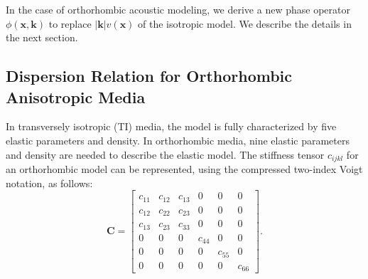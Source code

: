 In the case of orthorhombic acoustic modeling, 
we derive a new phase operator $\phi(\mathbf{x},\mathbf{k})$
to replace $|\mathbf{k}|v(\mathbf{x})$ of the isotropic model.
We describe the details in the next section.


\subsection{Dispersion Relation for Orthorhombic Anisotropic Media}

In transversely isotropic (TI) media, 
the model is fully characterized by five elastic parameters and density.
In orthorhombic media, nine elastic parameters and density are needed to describe the elastic model.
The stiffness tensor $c_{ijkl}$ for an orthorhombic model can be represented, 
using the compressed two-index Voigt notation, as follows:
\begin{equation}
  \label{eq:stiffness}
  \mathbf{C}= \left[\begin{array}{llllll}
           c_{11} & c_{12} & c_{13} & 0 & 0 & 0 \\
           c_{12} & c_{22} & c_{23} & 0 & 0 & 0 \\
           c_{13} & c_{23} & c_{33} & 0 & 0 & 0 \\
           0      & 0      & 0      & c_{44} & 0 & 0  \\
           0      & 0      & 0      & 0  & c_{55} & 0   \\
           0      & 0      & 0      & 0  & 0 & c_{66}    
          \end{array}\right]. 
\end{equation}

